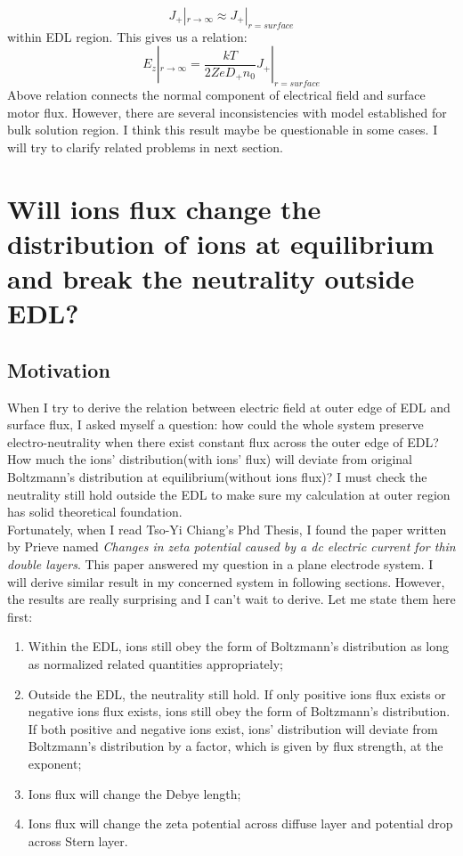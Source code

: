 \documentclass[fontsize=11pt, %
                             paper=a4, %
                             twoside, %
                             captions=tableheading,
                             index=totoc,
                             hyperref]{labbook}
\begin{document}
\begin{addmargin}[4cm]{0cm}
\begin{equation}
J_+|_{r\to\infty}\approx J_+|_{r=surface}
\end{equation}
within EDL region. This gives us a relation:
\begin{equation}
E_z|_{r\to\infty}=\frac{kT}{2Ze D_+ n_0}J_+|_{r=surface}
\end{equation}
Above relation connects the normal component of electrical field and surface motor flux. However, there are several inconsistencies with model established for bulk solution region. I think this result maybe be questionable in some cases. I will try to clarify related problems in next section.
\section{Will ions flux change the distribution of ions at equilibrium and break the neutrality outside EDL?}
\subsection{Motivation}
When I try to derive the relation between electric field at outer edge of EDL and surface flux, I asked myself a question: how could the whole system preserve electro-neutrality when there exist constant flux across the outer edge of EDL? How much the ions' distribution(with ions' flux) will deviate from original Boltzmann's distribution at equilibrium(without ions flux)? I must check the neutrality still hold outside the EDL to make sure my calculation at outer region has solid theoretical foundation.\\
Fortunately, when I read Tso-Yi Chiang's Phd Thesis\cite{Chiang2014}, I found the paper written by Prieve\cite{Prieve200467} named \emph{Changes in zeta potential caused by a dc electric current for thin double layers}. This paper answered my question in a plane electrode system. I will derive similar result in my concerned system in following sections. However, the results are really surprising and I can't wait to derive. Let me state them here first:\\
\begin{enumerate}
\item Within the EDL, ions still obey the form of Boltzmann's distribution as long as normalized related quantities appropriately;
\item Outside the EDL, the neutrality still hold. If only positive ions flux exists or negative ions flux exists, ions still obey the form of Boltzmann's distribution. If both positive and negative ions exist, ions' distribution will deviate from Boltzmann's distribution by a factor, which is given by flux strength, at the exponent;
\item Ions flux will change the Debye length;
\item Ions flux will change the zeta potential across diffuse layer and potential drop across Stern layer. 
\end{enumerate}

\end{addmargin}
\end{document}

